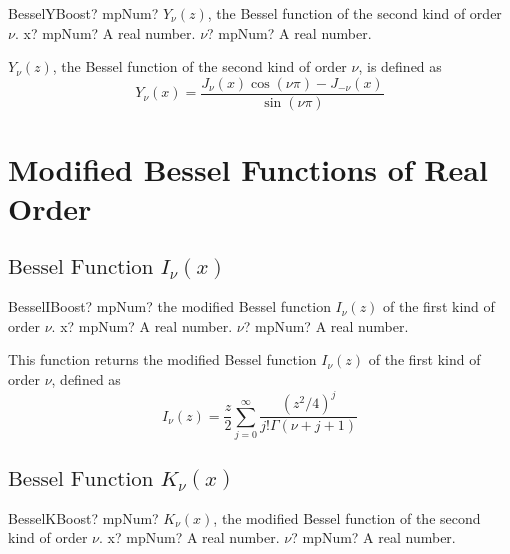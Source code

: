 \begin{mpFunctionsExtract}
	\mpFunctionTwo
	{BesselYBoost? mpNum? $Y_{\nu}(z)$, the Bessel function of the second kind of order $\nu$.}
	{x? mpNum? A real number.}
	{$\nu$? mpNum? A real number.}
\end{mpFunctionsExtract}


\vspace{0.3cm}
$Y_{\nu}(z)$, the Bessel function of the second kind of order $\nu$, is defined as
\begin{equation}
	Y_{\nu}(x)  = \frac{J_{\nu}(x) \cos(\nu \pi) - J_{-\nu}(x)}{ \sin(\nu \pi)}
\end{equation}





\section{Modified Bessel Functions of Real Order}
\label{ModifiedBesselFunctionsBoostReal}


\subsection{\texorpdfstring{$\text{Bessel Function }I_{\nu}(x)$}{Bessel Function Inu}}

\begin{mpFunctionsExtract}
	\mpFunctionTwo
	{BesselIBoost? mpNum? the modified Bessel function $I_{\nu}(z)$ of the first kind of order $\nu$.}
	{x? mpNum? A real number.}
	{$\nu$? mpNum? A real number.}
\end{mpFunctionsExtract}


\vspace{0.3cm}
This function returns the modified Bessel function $I_{\nu}(z)$ of the first kind of order $\nu$, defined as
\begin{equation}
	I_{\nu}(z)  = \frac{z}{2}  \sum_{j=0}^\infty \frac{(z^2 / 4)^j}{j! \Gamma(\nu+j+1)}
\end{equation}





\subsection{\texorpdfstring{$\text{Bessel Function }K_{\nu}(x)$}{Bessel Function Knu}}

\begin{mpFunctionsExtract}
	\mpFunctionTwo
	{BesselKBoost? mpNum? $K_{\nu}(x)$, the modified Bessel function of the second kind of order $\nu$.}
	{x? mpNum? A real number.}
	{$\nu$? mpNum? A real number.}
\end{mpFunctionsExtract}


